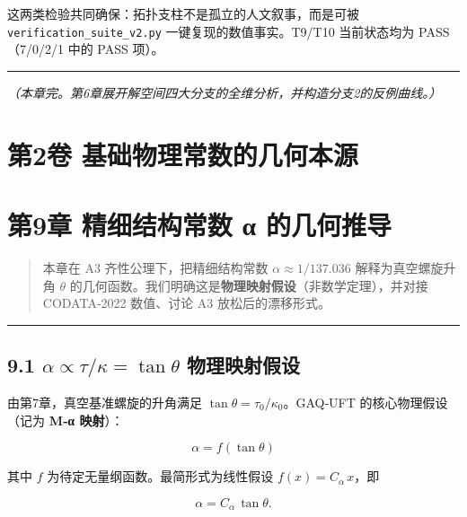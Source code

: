 这两类检验共同确保：拓扑支柱不是孤立的人文叙事，而是可被
\texttt{verification\_suite\_v2.py} 一键复现的数值事实。T9/T10
当前状态均为 PASS（7/0/2/1 中的 PASS 项）。

\begin{center}\rule{0.5\linewidth}{0.5pt}\end{center}

\emph{（本章完。第6章展开解空间四大分支的全维分析，并构造分支2的反例曲线。）}

\section{第2卷
基础物理常数的几何本源}\label{ux7b2c2ux5377-ux57faux7840ux7269ux7406ux5e38ux6570ux7684ux51e0ux4f55ux672cux6e90}

\section{第9章 精细结构常数 α
的几何推导}\label{ux7b2c9ux7ae0-ux7cbeux7ec6ux7ed3ux6784ux5e38ux6570-ux3b1-ux7684ux51e0ux4f55ux63a8ux5bfc-1}

\begin{quote}
本章在 A3 齐性公理下，把精细结构常数 \(\alpha\approx 1/137.036\)
解释为真空螺旋升角 \(\theta\)
的几何函数。我们明确这是\textbf{物理映射假设}（非数学定理），并对接
CODATA‑2022 数值、讨论 A3 放松后的漂移形式。
\end{quote}

\begin{center}\rule{0.5\linewidth}{0.5pt}\end{center}

\subsection{\texorpdfstring{9.1
\(\alpha \propto \tau/\kappa=\tan\theta\)
物理映射假设}{9.1 \textbackslash alpha \textbackslash propto \textbackslash tau/\textbackslash kappa=\textbackslash tan\textbackslash theta 物理映射假设}}\label{alpha-propto-taukappatantheta-ux7269ux7406ux6620ux5c04ux5047ux8bbe}

由第7章，真空基准螺旋的升角满足 \(\tan\theta=\tau_0/\kappa_0\)。GAQ‑UFT
的核心物理假设（记为 \textbf{M‑α 映射}）：

\[
\boxed{\alpha = f(\tan\theta)}
\]

其中 \(f\) 为待定无量纲函数。最简形式为线性假设 \(f(x)=C_\alpha\,x\)，即

\[
\alpha = C_\alpha\,\tan\theta.
\]

